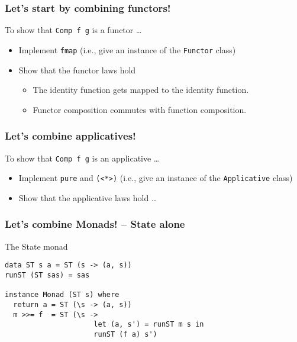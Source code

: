 \documentclass[pdftex,aspectratio=169]{beamer}
\begin{document}
\begin{frame}
  \frametitle{Let's start by combining functors!}
  \begin{block}{To show that \lstinline{Comp f g} is a functor \dots}
    \begin{itemize}
    \item Implement \lstinline{fmap} (i.e., give an instance of the
      \lstinline{Functor} class)
    \item Show that the functor laws hold
      \begin{itemize}
      \item The identity function gets mapped to the identity
        function.
      \item Functor composition commutes with function composition.
      \end{itemize}
    \end{itemize}
  \end{block}
\end{frame}

\begin{frame}
  \frametitle{Let's combine applicatives!}
  \begin{block}{To show that \lstinline{Comp f g} is an applicative \dots}
    \begin{itemize}
    \item Implement \lstinline{pure} and \lstinline{(<*>)} (i.e., give an instance of the
      \lstinline{Applicative} class)
    \item Show that the applicative laws hold \dots
    \end{itemize}
  \end{block}

\end{frame}

\begin{frame}[fragile]
  \frametitle{Let's combine Monads! -- State alone}

  \begin{block}{The State monad}
\begin{lstlisting}
data ST s a = ST (s -> (a, s))
runST (ST sas) = sas

instance Monad (ST s) where
  return a = ST (\s -> (a, s))
  m >>= f  = ST (\s ->
                     let (a, s') = runST m s in
                     runST (f a) s')
\end{lstlisting}
  \end{block}
\end{frame}
\end{document}
